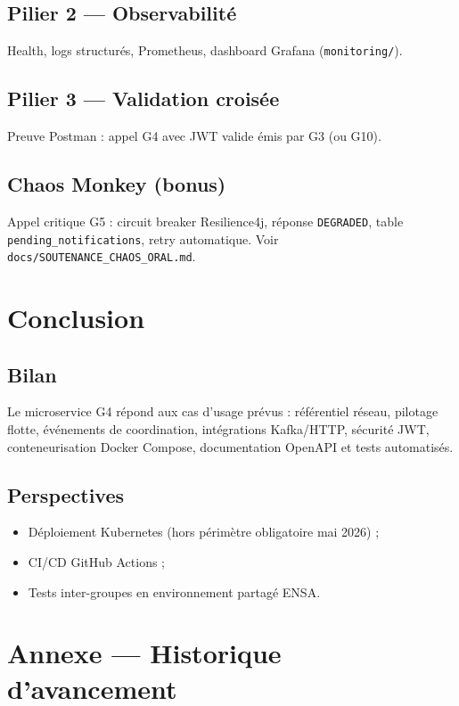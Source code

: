 \documentclass[12pt,a4paper]{report}
\begin{document}
\section{Pilier 2 — Observabilité}
Health, logs structurés, Prometheus, dashboard Grafana (\texttt{monitoring/}).

\section{Pilier 3 — Validation croisée}
Preuve Postman : appel G4 avec JWT valide émis par G3 (ou G10).

\section{Chaos Monkey (bonus)}
Appel critique G5 : circuit breaker Resilience4j, réponse \texttt{DEGRADED}, table \texttt{pending\_notifications}, retry automatique. Voir \texttt{docs/SOUTENANCE\_CHAOS\_ORAL.md}.

\chapter{Conclusion}

\section{Bilan}
Le microservice G4 répond aux cas d'usage prévus : référentiel réseau, pilotage flotte, événements de coordination, intégrations Kafka/HTTP, sécurité JWT, conteneurisation Docker Compose, documentation OpenAPI et tests automatisés.

\section{Perspectives}
\begin{itemize}
    \item Déploiement Kubernetes (hors périmètre obligatoire mai 2026) ;
    \item CI/CD GitHub Actions ;
    \item Tests inter-groupes en environnement partagé ENSA.
\end{itemize}

\chapter*{Annexe — Historique d'avancement}
\end{document}
